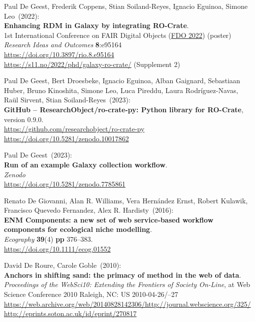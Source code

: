 \begin{thebibliography}{9}
Paul De Geest, Frederik Coppens, Stian
Soiland-Reyes, Ignacio Eguinoa, Simone Leo~(2022): \\
\textbf{Enhancing RDM in Galaxy by integrating RO-Crate}.\\
1st International Conference on FAIR Digital Objects
(\href{https://www.fdo2022.org/}{FDO 2022}) (poster)\\
\emph{Research Ideas and Outcomes} \textbf{8}:e95164\\
\url{https://doi.org/10.3897/rio.8.e95164}\\
\url{https://s11.no/2022/phd/galaxy-ro-crate/} (Supplement 2)

Paul De Geest, Bert Droesbeke, Ignacio Eguinoa, Alban Gaignard, Sebastiaan Huber, Bruno Kinoshita, Simone Leo, Luca Pireddu, Laura Rodríguez-Navas, Raül Sirvent, Stian Soiland-Reyes~(2023): \\
\textbf{GitHub -- ResearchObject/ro-crate-py: Python library for
RO-Crate}, version 0.9.0.\\
\url{https://github.com/researchobject/ro-crate-py}\\
\url{https://doi.org/10.5281/zenodo.10017862}

Paul De Geest~(2023): \\
\textbf{Run of an example Galaxy collection workflow}.\\
\emph{Zenodo}\\
\url{https://doi.org/10.5281/zenodo.7785861}

Renato De Giovanni, Alan R. Williams, Vera Hernández Ernst,
Robert Kulawik, Francisco Quevedo Fernandez, Alex R. Hardisty~(2016): \\
\textbf{ENM Components: a new set of web service‐based workflow
components for ecological niche modelling}.\\
\emph{Ecography}
\textbf{39}(4) \textbf{pp} 376--383.\\
\url{https://doi.org/10.1111/ecog.01552}

David De Roure, Carole Goble~(2010): \\
\textbf{Anchors in shifting sand: the primacy of method in the web of data}. \\
\emph{Proceedings of the WebSci10: Extending the Frontiers of Society On-Line},
at Web Science Conference 2010 Raleigh, NC: US 2010-04-26/--27\\
\url{https://web.archive.org/web/20140828142306/http://journal.webscience.org/325/}\\
\url{http://eprints.soton.ac.uk/id/eprint/270817} 


\end{thebibliography}
